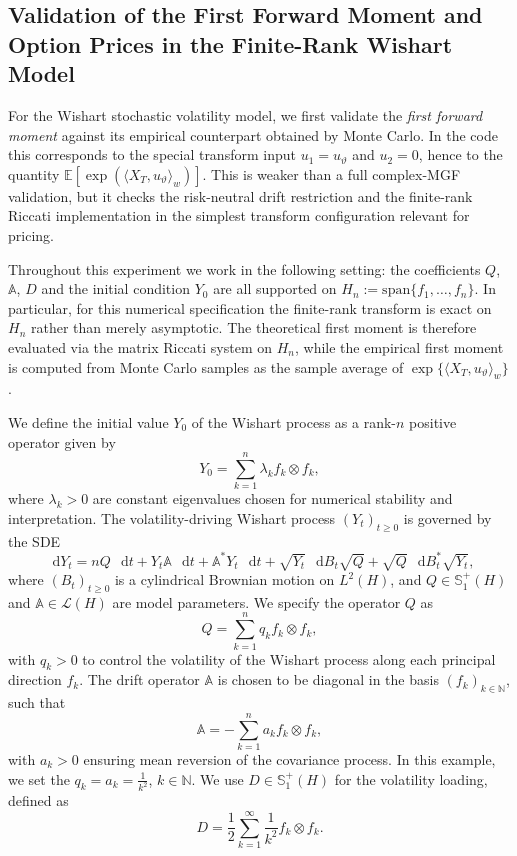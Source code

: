 \documentclass[10pt,a4paper,reqno]{amsart}
\newcommand*\D{\mathop{}\!\mathrm{d}}
\numberwithin{equation}{section}
\theoremstyle{plain}
\theoremstyle{definition}
\theoremstyle{example}
\newcommand{\MN}{\mathbb{N}}
\newcommand{\EX}[1]{\mathbb{E}\left[#1\right]}
\begin{document}
\subsection{Validation of the First Forward Moment and Option Prices in the Finite-Rank Wishart Model}

For the Wishart stochastic volatility model, we first validate the \emph{first forward moment} against its empirical counterpart obtained by Monte Carlo. In the code this corresponds to the special transform input $u_1=u_\vartheta$ and $u_2=0$, hence to the quantity $\EX{\exp(\langle X_T,u_\vartheta\rangle_w)}$. This is weaker than a full complex-MGF validation, but it checks the risk-neutral drift restriction and the finite-rank Riccati implementation in the simplest transform configuration relevant for pricing.

Throughout this experiment we work in the following setting: the coefficients $Q$, $\mathbb A$, $D$ and the initial condition $Y_0$ are all supported on $H_n:=\mathrm{span}\{f_1,\dots,f_n\}$. In particular, for this numerical specification the finite-rank transform is exact on $H_n$ rather than merely asymptotic. The theoretical first moment is therefore evaluated via the matrix Riccati system on $H_n$, while the empirical first moment is computed from Monte Carlo samples as the sample average of $\exp\{\langle X_T,u_\vartheta\rangle_w\}$.

We define the initial value $Y_0$ of the Wishart process as a rank-$n$ positive operator given by
$$
Y_0 = \sum_{k=1}^n \lambda_k f_k \otimes f_k,
$$
where $\lambda_k > 0$ are constant eigenvalues chosen for numerical stability and interpretation. The volatility-driving Wishart process $(Y_t)_{t \geq 0}$ is governed by the SDE
$$
\D Y_t = n Q\,\D t + Y_t \mathbb{A}\,\D t + \mathbb{A}^* Y_t\,\D t + \sqrt{Y_t}\,\D B_t \sqrt{Q} + \sqrt{Q}\,\D B_t^* \sqrt{Y_t},
$$
where $(B_t)_{t \geq 0}$ is a cylindrical Brownian motion on $L^2(H)$, and $Q \in \mathbb{S}_1^+(H)$ and $\mathbb{A} \in \mathcal{L}(H)$ are model parameters. We specify the operator $Q$ as
$$
Q = \sum_{k=1}^n q_k f_k \otimes f_k,
$$
with $q_k > 0$ to control the volatility of the Wishart process along each principal direction $f_k$. The drift operator $\mathbb{A}$ is chosen to be diagonal in the basis $(f_k)_{k\in\MN}$, such that
$$
\mathbb{A} = -\sum_{k=1}^n a_k f_k \otimes f_k,
$$
with $a_k > 0$ ensuring mean reversion of the covariance process. In this example, we set the $q_k=a_k=\frac{1}{k^2}$, $k\in \mathbb{N}$. We use $D \in \mathbb{S}_1^+(H)$ for the volatility loading, defined as
$$
D = \frac{1}{2} \sum_{k=1}^{\infty} \frac{1}{k^2} f_k \otimes f_k.
$$
\end{document}
